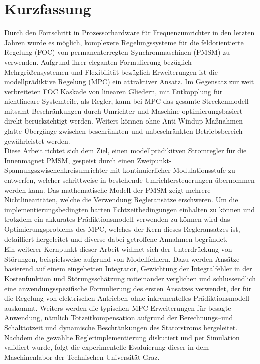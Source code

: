 \chapter*{\centering Kurzfassung}
Durch den Fortschritt in Prozessorhardware für Frequenzumrichter in den letzten Jahren wurde es möglich, komplexere Regelungssysteme für die feldorientierte Regelung (FOC) von permanenterregten Synchronmaschinen (PMSM) zu verwenden. Aufgrund ihrer eleganten Formulierung bezüglich Mehrgrößensystemen und Flexibilität bezüglich Erweiterungen ist die modellprädiktive Regelung (MPC) ein attraktiver Ansatz. Im Gegensatz zur weit verbreiteten FOC Kaskade von linearen  Gliedern, mit Entkopplung für nichtlineare Systemteile, als Regler, kann bei MPC das gesamte Streckenmodell mitsamt  Beschränkungen durch Umrichter und Maschine optimierungsbasiert direkt berücksichtigt werden. Weiters  können ohne Anti-Windup Maßnahmen glatte Übergänge zwischen beschränkten und unbeschränkten Betriebsbereich gewährleistet werden.\\
Diese Arbeit richtet sich dem Ziel, einen modellprädikitven Stromregler für die Innenmagnet PMSM, gespeist durch einen Zweipunkt-Spannungszwischenkreisumrichter mit kontinuierlicher Modulationsstufe zu entwerfen, welcher schrittweise in bestehende Umrichtersteuerungen übernommen werden kann. Das mathematische Modell der PMSM zeigt mehrere Nichtlinearitäten, welche die Verwendung Regleransätze erschweren. Um die implementierungsbedingten harten Echtzeitbedingungen einhalten zu können und trotzdem ein akkurates Prädiktionsmodell verwenden zu können wird das  Optimierungsproblems des MPC, welches der Kern dieses Regleransatzes ist, detailliert hergeleitet und diverse dabei getroffene Annahmen begründet.\\
Ein weiterer Kernpunkt dieser Arbeit widmet sich der Unterdrückung von Störungen, beispielsweise aufgrund von Modellfehlern. Dazu werden Ansätze basierend auf einem eingebetten Integrator, Gewichtung der Integralfehler in der Kostenfunktion und Störungsschätzung miteinander verglichen und schlussendlich eine anwendungsspezifische Formulierung des ersten Ansatzes verwendet, der für die Regelung von elektrischen Antrieben ohne inkrementelles Prädiktionsmodell auskommt.  Weiters werden die typischen MPC Erweiterungen für besagte Anwendung, nämlich Totzeitkompensation aufgrund der Berechnungs--und Schalttotzeit und dynamische Beschränkungen des Statorstroms hergeleitet.\\
Nachdem die gewählte Reglerimplementierung diskutiert und per Simulation validiert wurde, folgt die experimentelle Evaluierung dieser in dem Maschinenlabor der Technischen Universität Graz.
